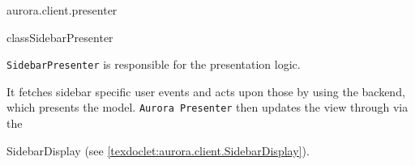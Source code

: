 \begin{texdocpackage}{aurora.client.presenter}
\begin{texdocclass}{class}{SidebarPresenter}{}{}
\label{texdoclet:aurora.client.presenter.SidebarPresenter}
\begin{texdocclassintro}
\begin{texdocp}
     \texttt{SidebarPresenter} is responsible for the presentation logic.
 \end{texdocp}\texdocbr  \begin{texdocp}
     It fetches sidebar specific user events and acts upon those
     by using the backend, which presents the model. \texttt{Aurora Presenter} then updates the view through
     via the \end{texdocp}SidebarDisplay (see \ref{texdoclet:aurora.client.SidebarDisplay}).
 \end{texdocclassintro}
\begin{texdocclassconstructors}
\end{texdocclassconstructors}
\end{texdocclass}


\end{texdocpackage}



